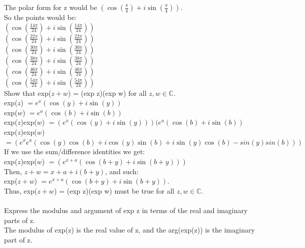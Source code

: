 \documentclass[12pt]{article}
\begin{document}
The polar form for z would be $(\cos(\frac{\pi}{4}) + i\sin(\frac{\pi}{4}))$.\\

So the points would be:\\

$(\cos(\frac{14\pi}{24}) + i\sin(\frac{14\pi}{24}))$\\
$(\cos(\frac{22\pi}{24}) + i\sin(\frac{22\pi}{24}))$\\
$(\cos(\frac{30\pi}{24}) + i\sin(\frac{30\pi}{24}))$\\
$(\cos(\frac{38\pi}{24}) + i\sin(\frac{38\pi}{24}))$\\
$(\cos(\frac{46\pi}{24}) + i\sin(\frac{46\pi}{24}))$\\
$(\cos(\frac{54\pi}{24}) + i\sin(\frac{54\pi}{24}))$\\

 Show that exp($z+w$) = (exp z)(exp w) for all $z,w \in \mathbb{C}$.\\

exp($z$) $ = e^{x}(\cos(y)+i\sin(y))$\\
exp($w$) $ = e^{a}(\cos(b)+i\sin(b))$\\

exp($z$)exp($w$) $ = (e^x(\cos(y)+i\sin(y)))(e^a(\cos(b)+i\sin(b))$\\ 
exp($z$)exp($w$) $ = (e^xe^a(\cos(y)\cos(b)+i\cos(y)\sin(b)+i\sin(y)\cos(b)-sin(y)sin(b)))$\\

If we use the sum/difference identities we get:\\ 

exp($z$)exp($w$) $ = (e^{x+a}(\cos(b+y)+i\sin(b+y)))$\\ 

Then, $z + w = x+a + i(b+y)$, and such:\\

exp($z+w$) $ = e^{x+a}(\cos(b+y) + i\sin(b+y))$.\\

Thus, exp($z+w$) = (exp z)(exp w) must be true for all $z,w \in \mathbb{C}$.\\


\\

 Express the modulus and argument of exp z in terms of the real and imaginary parts of z. \\

The modulus of exp(z) is the real value of z, and the arg(exp(z)) is the imaginary part of z.\\ 
\end{document}
